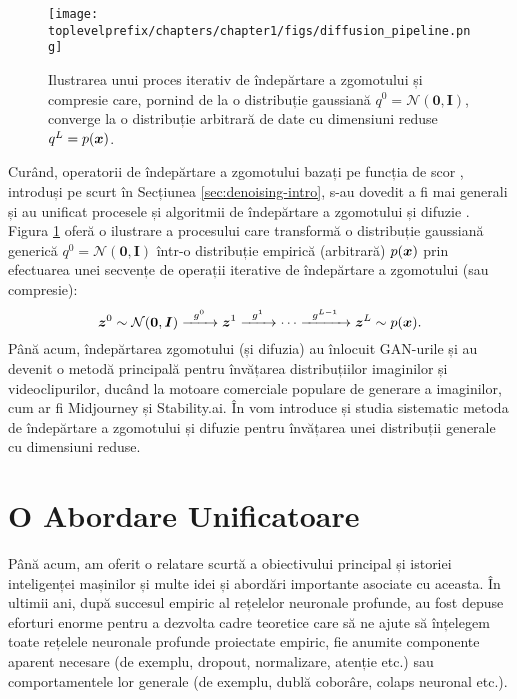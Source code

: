 \documentclass[../../book-main_ro.tex]{subfiles}
\begin{document}
\begin{figure}[t]
    \centering
    \texttt{[image: \\toplevelprefix/chapters/chapter1/figs/diffusion\_pipeline.png]}
    \caption{Ilustrarea unui proces iterativ de îndepărtare a zgomotului și compresie care, pornind de la o distribuție gaussiană $q^0 = \mathcal{N}(\boldsymbol{0}, \boldsymbol{I})$, converge la o distribuție arbitrară de date cu dimensiuni reduse $q^L = p(\bm{x})$.}
    \label{fig:diffusion}
\end{figure}

Curând, operatorii de îndepărtare a zgomotului bazați pe funcția de scor \cite{hyvarinen05a}, introduși pe scurt în Secțiunea \ref{sec:denoising-intro}, s-au dovedit a fi mai generali și au unificat procesele și algoritmii de îndepărtare a zgomotului și difuzie \cite{song2019,song2020score,ho2020denoising}. Figura \ref{fig:diffusion} oferă o ilustrare a procesului care transformă o distribuție gaussiană generică $q^0 = \mathcal{N}(\boldsymbol{0}, \boldsymbol{I})$ într-o distribuție empirică (arbitrară) $p(\bm{x})$ prin efectuarea unei secvențe de operații iterative de îndepărtare a zgomotului (sau compresie):
\begin{equation}
        \bm{z}^0 \sim  \mathcal{N}(\boldsymbol{0}, \boldsymbol{I})\xrightarrow{\hspace{2mm} g^0  \hspace{2mm}} \bm{z}^1 \xrightarrow{\hspace{2mm} g^1 \hspace{2mm}} \cdots \xrightarrow{\hspace{2mm} g^{L-1}  \hspace{2mm}} \bm{z}^L \sim p(\bm{x}).
\end{equation}
Până acum, îndepărtarea zgomotului (și difuzia) au înlocuit GAN-urile și au devenit o metodă principală pentru învățarea distribuțiilor imaginilor și videoclipurilor, ducând la motoare comerciale populare de generare a imaginilor, cum ar fi Midjourney și Stability.ai.
În  vom introduce și studia sistematic metoda de îndepărtare a zgomotului și difuzie pentru învățarea unei distribuții generale cu dimensiuni reduse.



\section{O Abordare Unificatoare}\label{sec:unifying-approach}
Până acum, am oferit o relatare scurtă a obiectivului principal și istoriei inteligenței mașinilor și multe idei și abordări importante asociate cu aceasta. În ultimii ani, după succesul empiric al rețelelor neuronale profunde, au fost depuse eforturi enorme pentru a dezvolta cadre teoretice care să ne ajute să înțelegem toate rețelele neuronale profunde proiectate empiric, fie anumite componente aparent necesare (de exemplu, dropout, normalizare, atenție etc.) sau comportamentele lor generale (de exemplu, dublă coborâre, colaps neuronal etc.).
\end{document}
